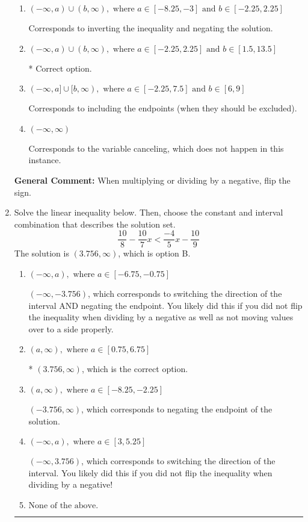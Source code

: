 \documentclass{extbook}[14pt]
\newcommand{\litem}[1]{\item #1

\rule{\textwidth}{0.4pt}}
\begin{document}
\begin{enumerate}
{\begin{enumerate}[label=\Alph*.]
Corresponds to including the endpoints AND negating.
\item \( (-\infty, a) \cup (b, \infty), \text{ where } a \in [-8.25, -3] \text{ and } b \in [-2.25, 2.25] \)

Corresponds to inverting the inequality and negating the solution.
\item \( (-\infty, a) \cup (b, \infty), \text{ where } a \in [-2.25, 2.25] \text{ and } b \in [1.5, 13.5] \)

 * Correct option.
\item \( (-\infty, a] \cup [b, \infty), \text{ where } a \in [-2.25, 7.5] \text{ and } b \in [6, 9] \)

Corresponds to including the endpoints (when they should be excluded).
\item \( (-\infty, \infty) \)

Corresponds to the variable canceling, which does not happen in this instance.
\end{enumerate}

\textbf{General Comment:} When multiplying or dividing by a negative, flip the sign.
}
\litem{
Solve the linear inequality below. Then, choose the constant and interval combination that describes the solution set.
\[ \frac{10}{8} - \frac{10}{7} x < \frac{-4}{5} x - \frac{10}{9} \]The solution is \( (3.756, \infty) \), which is option B.\begin{enumerate}[label=\Alph*.]
\item \( (-\infty, a), \text{ where } a \in [-6.75, -0.75] \)

 $(-\infty, -3.756)$, which corresponds to switching the direction of the interval AND negating the endpoint. You likely did this if you did not flip the inequality when dividing by a negative as well as not moving values over to a side properly.
\item \( (a, \infty), \text{ where } a \in [0.75, 6.75] \)

* $(3.756, \infty)$, which is the correct option.
\item \( (a, \infty), \text{ where } a \in [-8.25, -2.25] \)

 $(-3.756, \infty)$, which corresponds to negating the endpoint of the solution.
\item \( (-\infty, a), \text{ where } a \in [3, 5.25] \)

 $(-\infty, 3.756)$, which corresponds to switching the direction of the interval. You likely did this if you did not flip the inequality when dividing by a negative!
\item \( \text{None of the above}. \)


\end{enumerate}}
\end{enumerate}
\end{document}
